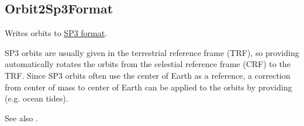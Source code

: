 \clearpage
\subsection{Orbit2Sp3Format}\label{Orbit2Sp3Format}
Writes orbits to \href{https://files.igs.org/pub/data/format/sp3d.pdf}{SP3 format}.

SP3 orbits are usually given in the terrestrial reference frame (TRF), so providing 
automatically rotates the orbits from the celestial reference frame (CRF) to the TRF.
Since SP3 orbits often use the center of Earth as a reference, a correction from center of mass to center
of Earth can be applied to the orbits by providing  (e.g. ocean tides).

See also .


